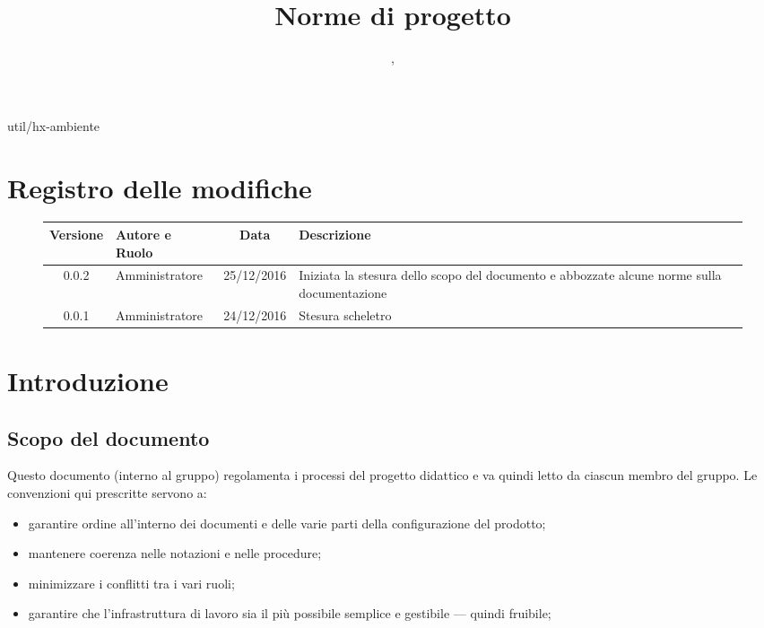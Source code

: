 
 {util/hx-ambiente}
\author{\GG, \MM}
\supervisor{\LB, \AZ}
\title{Norme di progetto}

\renewcommand{\arraystretch}{1.5}
\setcounter{tocdepth}{4}
\setcounter{secnumdepth}{4}


\maketitle
\section*{Registro delle modifiche}
\begin{figure}[htb]
	\centering
	\begin{tabular}{cp{3cm}cp{3cm}}
	Versione & Autore e Ruolo       & Data       & Descrizione \\ \hline
	0.0.2    & {\GG} Amministratore & 25/12/2016 & Iniziata la stesura dello scopo del documento e abbozzate alcune norme sulla documentazione \\ \hline
	0.0.1    & {\MM} Amministratore & 24/12/2016 & Stesura scheletro \\ \hline
	\end{tabular}
\end{figure}
\tableofcontents

\section{Introduzione}

\subsection{Scopo del documento}
Questo documento (interno al gruppo) regolamenta i processi del progetto didattico e va quindi letto da ciascun membro del gruppo. Le convenzioni qui prescritte servono a:
\begin{itemize}
	\item garantire ordine all'interno dei documenti e delle varie parti della configurazione del prodotto;
	\item mantenere coerenza nelle notazioni e nelle procedure;
	\item minimizzare i conflitti tra i vari ruoli;
	\item garantire che l'infrastruttura di lavoro sia il più possibile semplice e gestibile --- quindi fruibile;
\end{itemize}

